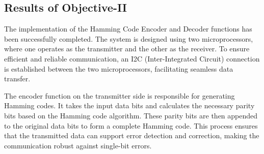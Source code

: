 \documentclass{article}
\numberwithin{equation}{section}
\numberwithin{figure}{section}
\numberwithin{table}{section}
\begin{document}
  
  

\subsection{Results of Objective-II}
The implementation of the Hamming Code Encoder and Decoder functions has been successfully completed. The system is designed using two microprocessors, where one operates as the transmitter and the other as the receiver. To ensure efficient and reliable communication, an I2C (Inter-Integrated Circuit) connection is established between the two microprocessors, facilitating seamless data transfer.

The encoder function on the transmitter side is responsible for generating Hamming codes. It takes the input data bits and calculates the necessary parity bits based on the Hamming code algorithm. These parity bits are then appended to the original data bits to form a complete Hamming code. This process ensures that the transmitted data can support error detection and correction, making the communication robust against single-bit errors.
\end{document}
